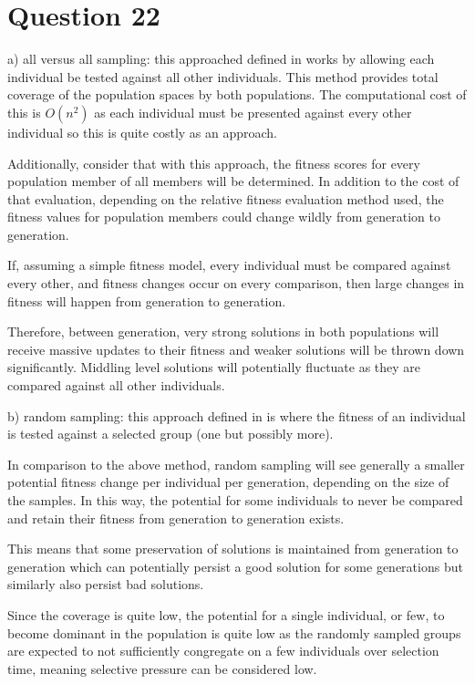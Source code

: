 \documentclass[12pt]{article}
\begin{document}
\section{Question 22}
a) all versus all sampling: this approached defined in \cite{axelrod-1987b} works by allowing each individual be tested against all other individuals. This method provides total coverage of the population spaces by both populations. The computational cost of this is $O(n^2)$ as each individual must be presented against every other individual so this is quite costly as an approach.

	Additionally, consider that with this approach, the fitness scores for every population member of all members will be determined. In addition to the cost of that evaluation, depending on the relative fitness evaluation method used, the fitness values for population members could change wildly from generation to generation. 

	If, assuming a simple fitness model, every individual must be compared against every other, and fitness changes occur on every comparison, then large changes in fitness will happen from generation to generation. 

	Therefore, between generation, very strong solutions in both populations will receive massive updates to their fitness and weaker solutions will be thrown down significantly. Middling level solutions will potentially fluctuate as they are compared against all other individuals. 

	b) random sampling: this approach defined in \cite{reed_toombs_barricelli_1967} is where the fitness of an individual is tested against a selected group (one but possibly more).

	In comparison to the above method, random sampling will see generally a smaller potential fitness change per individual per generation, depending on the size of the samples. In this way, the potential for some individuals to never be compared and retain their fitness from generation to generation exists. 

	This means that some preservation of solutions is maintained from generation to generation which can potentially persist a good solution for some generations but similarly also persist bad solutions.

	Since the coverage is quite low, the potential for a single individual, or few, to become dominant in the population is quite low as the randomly sampled groups are expected to not sufficiently congregate on a few individuals over selection time, meaning selective pressure can be considered low.
\end{document}
